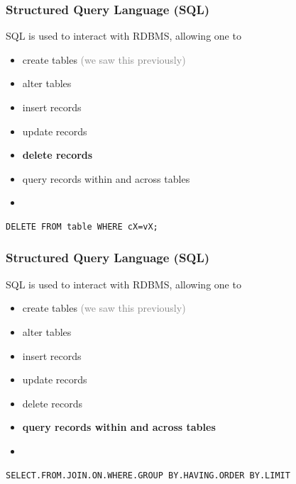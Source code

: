 \documentclass[xcolor={dvipsnames}]{beamer}
\begin{document}
\begin{frame}[fragile]\frametitle{Structured Query Language (SQL)}
SQL is used to interact with RDBMS, allowing one to 
\begin{itemize}
\item create tables \textcolor{gray}{(we saw this previously)}
\item alter tables
\item insert records
\item update records
\item \textbf{delete records}
\item query records within and across tables
\item[]
\end{itemize}

\begin{verbatim}
DELETE FROM table WHERE cX=vX;
\end{verbatim}
\end{frame}

\begin{frame}[fragile]\frametitle{Structured Query Language (SQL)}
SQL is used to interact with RDBMS, allowing one to 
\begin{itemize}
\item create tables \textcolor{gray}{(we saw this previously)}
\item alter tables
\item insert records
\item update records
\item delete records
\item \textbf{query records within and across tables}
\item[]
\end{itemize}

\begin{verbatim}
SELECT.FROM.JOIN.ON.WHERE.GROUP BY.HAVING.ORDER BY.LIMIT 
\end{verbatim}
\end{frame}
\end{document}
